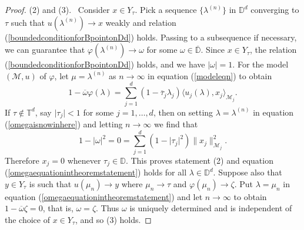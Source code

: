 \documentclass[11pt, reqno]{amsart}
\newcommand\1{\boldsymbol {1}}
\numberwithin{equation}{section}
\begin{document}
\begin{proof}
(2) and (3). ~Consider $x\in Y_{\tau}$. Pick a sequence $\{\lambda^{(n)}\}$ in $\mathbb{D}^{d}$ converging to $\tau$ such that $u(\lambda^{(n)})\rightarrow x$ weakly and relation (\ref{boundedconditionforBpointonDd}) holds. Passing to a subsequence if necessary, we can guarantee that $\varphi(\lambda^{(n)})\rightarrow \omega$ for some $\omega\in\overline{\mathbb{D}}$. Since $x\in Y_{\tau}$, the relation (\ref{boundedconditionforBpointonDd}) holds, and we have $\lvert\omega\rvert=1$. For the model $(\mathcal{M},u)$ of $\varphi$, let $\mu=\lambda^{(n)}$ as $n\rightarrow \infty$ in equation (\ref{modeleqn}) to obtain
\begin{equation}\label{omegaisnowinhere}
1-\overline{\omega}\varphi(\lambda)=\sum_{j=1}^{d}(1-\overline{\tau}_{j}\lambda_{j})\langle u_{j}(\lambda),x_{j}\rangle_{\mathcal{M}_{j}}.
\end{equation}
If $\tau\notin\mathbb{T}^{d}$, say $\lvert \tau_{j}\rvert <1$ for some $j=1,\hdots,d$, then on setting $\lambda=\lambda^{(n)}$ in equation (\ref{omegaisnowinhere}) and letting $n\rightarrow\infty$ we find that
$$1-\lvert\omega\rvert^{2}=0=\sum_{j=1}^{d}(1-\lvert\tau_{j}\rvert^{2})\| x_{j}\|^{2}_{\mathcal{M}_{j}}.$$
Therefore $x_{j}=0$ whenever $\tau_{j}\in\mathbb{D}$. This proves statement (2) and equation (\ref{omegaequationintheoremstatement}) holds for all $\lambda\in\mathbb{D}^{d}$. Suppose also that $y\in Y_{\tau}$ is such that $u(\mu_{n})\rightarrow y$ where $\mu_{n}\rightarrow \tau$ and $\varphi(\mu_{n})\rightarrow\zeta$. Put $\lambda=\mu_{n}$ in equation (\ref{omegaequationintheoremstatement}) and let $n\rightarrow \infty$ to obtain $1-\overline{\omega}\zeta=0$, that is, $\omega=\zeta$. Thus $\omega$ is uniquely determined and is independent of the choice of $x\in Y_{\tau}$, and so (3) holds.
\end{proof}
\end{document}
